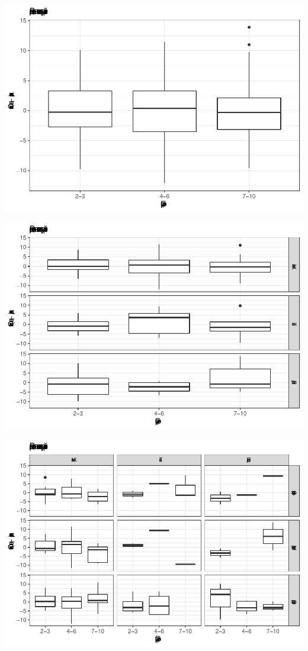 \documentclass[
]{article}
\begin{document}
\begin{center}\includegraphics{Regression-model-for-estimating-RM_files/figure-latex/unnamed-chunk-34-1} \end{center}

\begin{center}\includegraphics{Regression-model-for-estimating-RM_files/figure-latex/unnamed-chunk-34-2} \end{center}

\begin{center}\includegraphics{Regression-model-for-estimating-RM_files/figure-latex/unnamed-chunk-34-3} \end{center}
\end{document}
